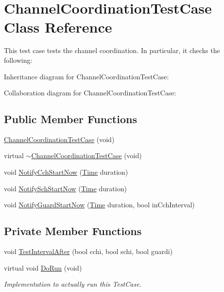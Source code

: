 \hypertarget{classChannelCoordinationTestCase}{}\section{Channel\+Coordination\+Test\+Case Class Reference}
\label{classChannelCoordinationTestCase}


This test case tests the channel coordination. In particular, it checks the following\+:  




Inheritance diagram for Channel\+Coordination\+Test\+Case\+:


Collaboration diagram for Channel\+Coordination\+Test\+Case\+:
\subsection*{Public Member Functions}
\begin{DoxyCompactItemize}
\item 
\hyperlink{classChannelCoordinationTestCase_a69997913e01988a59d2177e348eebe22}{Channel\+Coordination\+Test\+Case} (void)
\item 
virtual \hyperlink{classChannelCoordinationTestCase_a658e52dff8ea76f9308a0be63490aca6}{$\sim$\+Channel\+Coordination\+Test\+Case} (void)
\item 
void \hyperlink{classChannelCoordinationTestCase_aa2e75392bb7cb3146cf254c1863385c9}{Notify\+Cch\+Start\+Now} (\hyperlink{classns3_1_1Time}{Time} duration)
\item 
void \hyperlink{classChannelCoordinationTestCase_a4e52b667926d9120ce45914037c27ef8}{Notify\+Sch\+Start\+Now} (\hyperlink{classns3_1_1Time}{Time} duration)
\item 
void \hyperlink{classChannelCoordinationTestCase_a7514a5957cc7f602d6a0fbe9da0333cd}{Notify\+Guard\+Start\+Now} (\hyperlink{classns3_1_1Time}{Time} duration, bool in\+Cch\+Interval)
\end{DoxyCompactItemize}
\subsection*{Private Member Functions}
\begin{DoxyCompactItemize}
\item 
void \hyperlink{classChannelCoordinationTestCase_a5a6891984b8599dbffd80e80b6faf92a}{Test\+Interval\+After} (bool cchi, bool schi, bool guardi)
\item 
virtual void \hyperlink{classChannelCoordinationTestCase_a14d33785e7385a37fa7f14700ffde861}{Do\+Run} (void)
\begin{DoxyCompactList}\small\item\em Implementation to actually run this Test\+Case. \end{DoxyCompactList}\end{DoxyCompactItemize}

